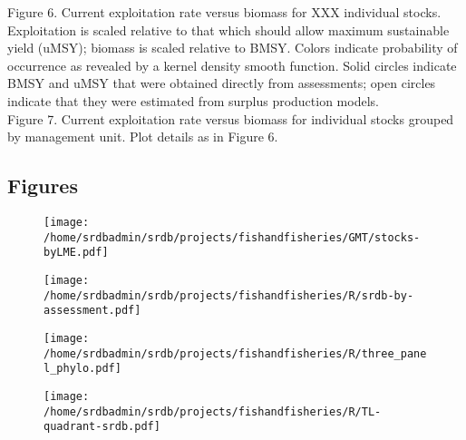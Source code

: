 \noindent Figure 6. Current exploitation rate versus biomass for XXX
individual stocks. Exploitation is scaled relative to that which
should allow maximum sustainable yield (uMSY); biomass is scaled
relative to BMSY. Colors indicate probability of occurrence as
revealed by a kernel density smooth function. Solid circles indicate
BMSY and uMSY that were obtained directly from assessments; open circles
indicate that they were estimated from surplus production models.\\ 

\noindent Figure 7. Current exploitation rate versus biomass for
individual stocks grouped by management unit. Plot details as in
Figure 6.\\ 


\newpage
\subsection*{Figures}

\begin{figure}
\begin{center}
\texttt{[image: /home/srdbadmin/srdb/projects/fishandfisheries/GMT/stocks-byLME.pdf]}
\end{center}
\caption{ }\label{fig:lmes}
\end{figure}

\begin{figure}
\begin{center}
\texttt{[image: /home/srdbadmin/srdb/projects/fishandfisheries/R/srdb-by-assessment.pdf]} %
\end{center}
\caption{ }\label{fig:taxo:srdb}
\end{figure}


\begin{figure}
\begin{center}
\texttt{[image: /home/srdbadmin/srdb/projects/fishandfisheries/R/three\_panel\_phylo.pdf]} %
\end{center}
\caption{ }\label{fig:taxo:threepanel}
\end{figure}

\begin{figure}
\begin{center}
\texttt{[image: /home/srdbadmin/srdb/projects/fishandfisheries/R/TL-quadrant-srdb.pdf]}
\end{center}
\caption{ }\label{fig:TL}
\end{figure}

